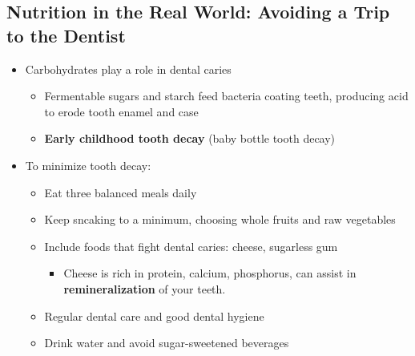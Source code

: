 \documentclass[12pt]{article}
\begin{document}
        \subsection{Nutrition in the Real World: Avoiding a Trip to the Dentist}
            \begin{itemize}
                \item Carbohydrates play a role in dental caries
                    \begin{itemize}
                        \item Fermentable sugars and starch feed bacteria coating teeth, producing acid to erode tooth enamel and case
                        \item \textbf{Early childhood tooth decay} (baby bottle tooth decay)
                    \end{itemize}
                \item To minimize tooth decay:
                    \begin{itemize}
                        \item Eat three balanced meals daily
                        \item Keep sncaking to a minimum, choosing whole fruits and raw vegetables
                        \item Include foods that fight dental caries: cheese, sugarless gum
                            \begin{itemize}
                                \item Cheese is rich in protein, calcium, phosphorus, can assist in \textbf{remineralization} of your teeth.
                            \end{itemize}
                        \item Regular dental care and good dental hygiene
                        \item Drink water and avoid sugar-sweetened beverages
                    \end{itemize}
            \end{itemize}
    
\end{document}
